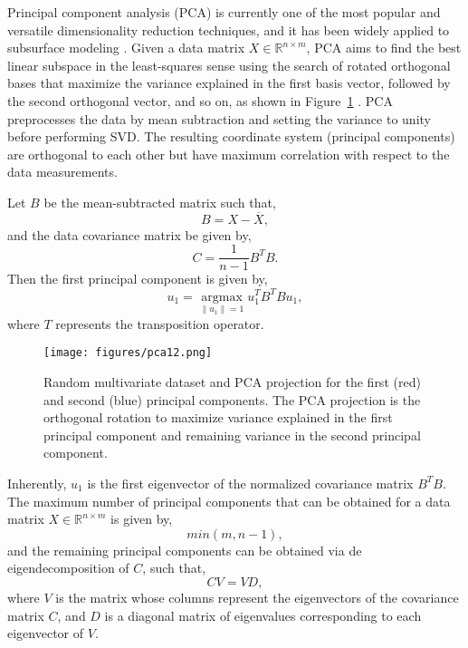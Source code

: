 \documentclass[a4paper,fleqn,12pt]{article}
\begin{document}
Principal component analysis (PCA) is currently one of the most popular and versatile dimensionality reduction techniques, and it has been widely applied to subsurface modeling \cite{sarma2007new, vo2014new, pyrcz2024appliedml}. Given a data matrix $X\in\mathbb{R}^{n\times m}$, PCA aims to find the best linear subspace in the least-squares sense using the search of rotated orthogonal bases that maximize the variance explained in the first basis vector, followed by the second orthogonal vector, and so on, as shown in Figure~\ref{fig:pca12} \cite{jolliffe2016principal, abdi2010principal}. PCA preprocesses the data by mean subtraction and setting the variance to unity before performing SVD. The resulting coordinate system (principal components) are orthogonal to each other but have maximum correlation with respect to the data measurements. 

Let $B$ be the mean-subtracted matrix such that,
\begin{equation}
    B=X-\overline{X} ,
\end{equation}
and the data covariance matrix be given by,
\begin{equation}
    C=\frac{1}{n-1}B^TB .
\end{equation}
Then the first principal component is given by,
\begin{equation}
    u_1 = \operatorname*{argmax}_{\|u_1\|=1} u_1^TB^TBu_1 ,
\end{equation}
where $T$ represents the transposition operator.

\begin{figure}[H]
    \centering
    \texttt{[image: figures/pca12.png]}
    \caption{Random multivariate dataset and PCA projection for the first (red) and second (blue) principal components. The PCA projection is the orthogonal rotation to maximize variance explained in the first principal component and remaining variance in the second principal component.}
    \label{fig:pca12}
\end{figure}

Inherently, $u_1$ is the first eigenvector of the normalized covariance matrix $B^TB$. The maximum number of principal components that can be obtained for a data matrix $X\in\mathbb{R}^{n\times m}$ is given by,
\begin{equation}
    min(m,n-1) ,
\end{equation}
and the remaining principal components can be obtained via de eigendecomposition of $C$, such that,
\begin{equation}
    CV = VD ,
\end{equation}
where $V$ is the matrix whose columns represent the eigenvectors of the covariance matrix $C$, and $D$ is a diagonal matrix of eigenvalues corresponding to each eigenvector of $V$.
\end{document}

